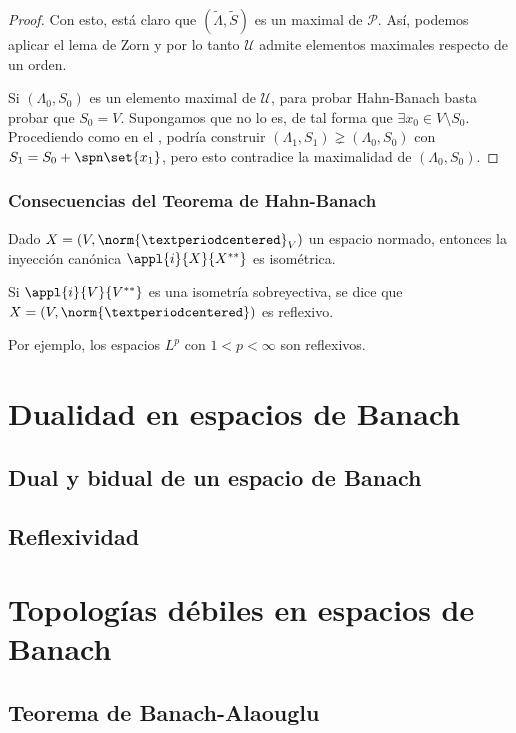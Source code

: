 \documentclass[bibnumbers, palatino]{apuntes}
\begin{document}
\begin{proof}
Con esto, está claro que $(\tilde{Λ}, \tilde{S})$ es un maximal de $\mathcal{P}$. Así, podemos aplicar el lema de Zorn y por lo tanto $\mathcal{U}$ admite elementos maximales respecto de un orden.

Si $(Λ_0, S_0)$ es un elemento maximal de $\mathcal{U}$, para probar Hahn-Banach basta probar que $S_0 = V$.  Supongamos que no lo es, de tal forma que $∃x_0 ∈ V \setminus S_0$. Procediendo como en el , podría construir $(Λ_1, S_1) \gneq (Λ_0, S_0)$ con $S_1 = S_0 + \spn \set{x_1}$, pero esto contradice la maximalidad de $(Λ_0, S_0)$.
\end{proof}

\subsection{Consecuencias del Teorema de Hahn-Banach}

\begin{prop} Dado $X= (V, \norm{·}_V)$ un espacio normado, entonces la inyección canónica $\appl{i}{X}{X^{**}}$ es isométrica.
\end{prop}

\begin{defn} Si $\appl{i}{V}{V^{**}}$ es una isometría sobreyectiva, se dice que $X = (V, \norm{·})$ es reflexivo.
\end{defn}

Por ejemplo, los espacios $L^p$ con $1 < p < ∞$ son reflexivos.

\chapter{Dualidad en espacios de Banach}

\section{Dual y bidual de un espacio de Banach}

\section{Reflexividad}

\chapter{Topologías débiles en espacios de Banach}

\section{Teorema de Banach-Alaouglu}
\end{document}

